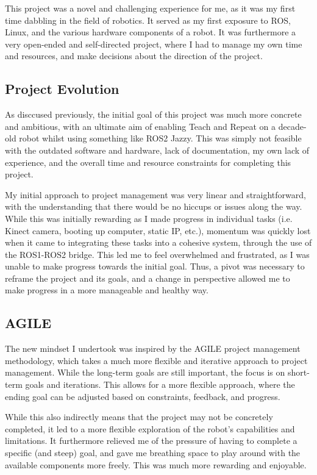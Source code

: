 \documentclass[a4paper, 12pt]{article}
\begin{document}
    This project was a novel and challenging experience for me, as it was my first time dabbling in the field of robotics. It served as my first exposure to ROS, Linux, and the various hardware components of a robot. It was furthermore a very open-ended and self-directed project, where I had to manage my own time and resources, and make decisions about the direction of the project.

    \subsection{Project Evolution}

    As disccused previously, the initial goal of this project was much more concrete and ambitious, with an ultimate aim of enabling Teach and Repeat on a decade-old robot whilst using something like ROS2 Jazzy. This was simply not feasible with the outdated software and hardware, lack of documentation, my own lack of experience, and the overall time and resource constraints for completing this project. 
    
    My initial approach to project management was very linear and straightforward, with the understanding that there would be no hiccups or issues along the way. While this was initially rewarding as I made progress in individual tasks (i.e. Kinect camera, booting up computer, static IP, etc.), momentum was quickly lost when it came to integrating these tasks into a cohesive system, through the use of the ROS1-ROS2 bridge. This led me to feel overwhelmed and frustrated, as I was unable to make progress towards the initial goal. Thus, a pivot was necessary to reframe the project and its goals, and a change in perspective allowed me to make progress in a more manageable and healthy way.

    \subsection{AGILE}

    The new mindset I undertook was inspired by the AGILE project management methodology, which takes a much more flexible and iterative approach to project management. While the long-term goals are still important, the focus is on short-term goals and iterations. This allows for a more flexible approach, where the ending goal can be adjusted based on constraints, feedback, and progress. 

    While this also indirectly means that the project may not be concretely completed, it led to a more flexible exploration of the robot's capabilities and limitations. It furthermore relieved me of the pressure of having to complete a specific (and steep) goal, and gave me breathing space to play around with the available components more freely. This was much more rewarding and enjoyable.
\end{document}
